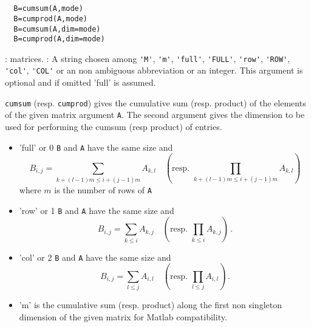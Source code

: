 \begin{mandesc}
  \\ %
  \\ %
\end{mandesc}
\begin{calling_sequence}
\begin{verbatim}
  B=cumsum(A,mode)  
  B=cumprod(A,mode)  
  B=cumsum(A,dim=mode) 
  B=cumprod(A,dim=mode)  
\end{verbatim}
\end{calling_sequence}
\begin{parameters}
  \begin{varlist}
    : matrices.
    : A string chosen among \verb+'M'+, \verb+'m'+, \verb+'full'+, \verb+'FULL'+, \verb+'row'+,
    \verb+'ROW'+, \verb+'col'+, \verb+'COL'+ or an non ambiguous abbreviation or an integer. 
    This argument is optional and if omitted 'full' is assumed.
  \end{varlist}
\end{parameters}
\begin{mandescription}
  \verb+cumsum+ (resp. \verb+cumprod+) gives the cumulative sum (resp. product) of the 
  elements of the given matrix argument \verb+A+. 
  The second argument gives the dimension to be used for performing the cumsum (resp product) of entries.       
  \begin{itemize}
    \item 'full' or 0 \verb+B+ and \verb+A+ have the same size and 
     $$B_{i,j} = \sum_{k+(l-1)m \le i+(j-1)m } A_{k,l} \quad \left( \text{resp. } \prod_{k+(l-1)m \le i+(j-1)m } A_{k,l} \right)$$ 
     where $m$ is the number of rows of \verb+A+
    \item 'row' or 1  \verb+B+ and \verb+A+ have the same size and 
     $$B_{i,j} = \sum_{k\le i} A_{k,j}\quad \left(\text{resp. }  \prod_{k\le i} A_{k,j}\right) \,. $$     
    \item 'col' or 2  \verb+B+ and \verb+A+ have the same size and 
         $$B_{i,j} = \sum_{l\le j} A_{i,l} \quad \left(\text{resp. }  \prod_{l\le j} A_{i,l}  \right) \,. $$     
    \item 'm' is the cumulative sum (resp. product) along the first non singleton dimension of the given matrix 
      for Matlab compatibility. 
  \end{itemize}
\end{mandescription}
\begin{examples}
  \begin{program}
  \end{program}
\end{examples}
\begin{manseealso}
     
\end{manseealso}

